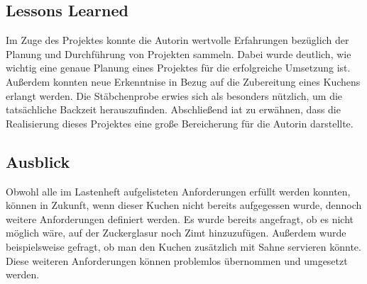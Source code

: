 \subsection{Lessons Learned}
Im Zuge des Projektes konnte die Autorin wertvolle Erfahrungen bezüglich der Planung und Durchführung von Projekten sammeln.
Dabei wurde deutlich, wie wichtig eine genaue Planung eines Projektes für die erfolgreiche Umsetzung ist. Außerdem konnten neue Erkenntnise in Bezug auf die Zubereitung eines Kuchens erlangt werden.
Die Stäbchenprobe erwies sich als besonders nützlich, um die tatsächliche Backzeit herauszufinden. Abschließend iat zu erwähnen, dass die Realisierung dieses Projektes eine große Bereicherung für die Autorin darstellte.
\subsection{Ausblick}
Obwohl alle im Lastenheft aufgelisteten Anforderungen erfüllt werden konnten, können in Zukunft, wenn dieser Kuchen nicht bereits aufgegessen wurde, dennoch weitere Anforderungen definiert werden. Es wurde bereits angefragt, ob es nicht möglich wäre, auf der Zuckerglasur noch Zimt hinzuzufügen. 
Außerdem wurde beispielsweise gefragt, ob man den Kuchen zusätzlich mit Sahne servieren könnte. Diese weiteren Anforderungen können problemlos übernommen und umgesetzt werden.
